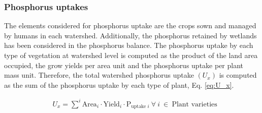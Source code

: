\begin{refsection}[referencesCh3]
\subsubsection{Phosphorus uptakes}
The elements considered for phosphorus uptake are the crops sown and managed by humans in each watershed. Additionally, the phosphorus retained by wetlands has been considered in the phosphorus balance. The phosphorus uptake by each type of vegetation at watershed level is computed as the product of the land area occupied, the grow yields per area unit and the phosphorus uptake per plant mass unit. Therefore, the total watershed phosphorus uptake $\left(U_{x}\right)$ is computed as the sum of the phosphorus uptake by each type of plant, Eq. \ref{eq:U_x}.

\begin{align}
& U_{x} = \sum^{i} \text{Area}_{i} \cdot \text{Yield}_{i} \cdot \text{P}_{\text{uptake }i} \ \forall \ i \ \in \ {\text{Plant varieties}} \label{eq:U_x}
\end{align}

\end{refsection}

